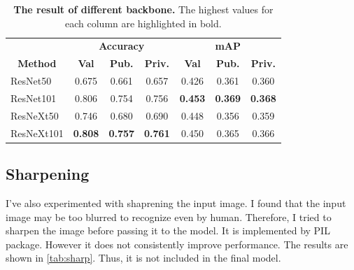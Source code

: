 \documentclass[10pt,twocolumn,letterpaper]{article}
\begin{document}
\begin{table}[h]
  \centering
  \setlength{\tabcolsep}{3.5pt}
  \begin{tabular}{lcccccc}
    \toprule
                                        & \multicolumn{3}{c}{\textbf{Accuracy}}            & \multicolumn{3}{c}{\textbf{mAP}}                 \\
    \cmidrule[0.3pt](lr){2-4} \cmidrule(lr){5-7}
    \multicolumn{1}{c}{\textbf{Method}} & \textbf{Val}   & \textbf{Pub.}  & \textbf{Priv.} & \textbf{Val}   & \textbf{Pub.}  & \textbf{Priv.} \\
    \midrule
    ResNet50                            & 0.675          & 0.661          & 0.657          & 0.426          & 0.361          & 0.360          \\
    ResNet101                           & 0.806          & 0.754          & 0.756          & \textbf{0.453} & \textbf{0.369} & \textbf{0.368} \\
    ResNeXt50                           & 0.746          & 0.680          & 0.690          & 0.448          & 0.356          & 0.359          \\
    ResNeXt101                          & \textbf{0.808} & \textbf{0.757} & \textbf{0.761} & 0.450          & 0.365          & 0.366          \\
    \bottomrule
  \end{tabular}
  \caption{\textbf{The result of different backbone.} The highest values
    for each column are highlighted in bold.
  }
  \label{tab:backbone-exp}
\end{table}

\subsection*{Sharpening}

I've also experimented with shaprening the input image. I found
that the input image may be too blurred to recognize even by
human. Therefore, I tried to sharpen the image before passing it
to the model. It is implemented by PIL package. However it does
not consistently improve performance. The results are shown in
\cref{tab:sharp}. Thus, it is not included in the final model.
\end{document}
